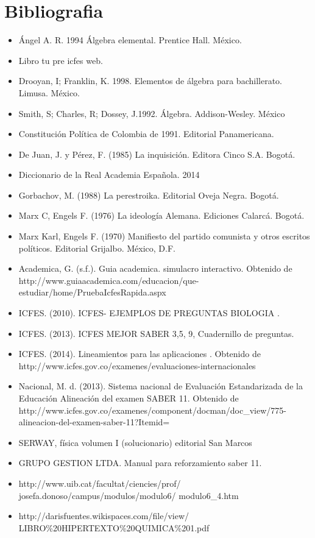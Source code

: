 \chapter{Bibliografia}

\begin{itemize}\label{vic-bib}
\item Ángel A. R. 1994 Álgebra elemental. Prentice Hall. México.
\item Libro tu pre icfes web.
\item Drooyan, I; Franklin, K. 1998. Elementos de álgebra para bachillerato. Limusa. México.
\item Smith, S; Charles, R; Dossey, J.1992. Álgebra. Addison-Wesley. México


\item Constitución Política de Colombia de 1991. Editorial Panamericana.
\item De Juan, J. y Pérez, F. (1985) La inquisición. Editora Cinco S.A. Bogotá.
\item Diccionario de la Real Academia Española. 2014
\item Gorbachov, M. (1988) La perestroika. Editorial Oveja Negra. Bogotá.
\item Marx C, Engels F. (1976) La ideología Alemana. Ediciones Calarcá. Bogotá.
\item Marx Karl, Engels F. (1970) Manifiesto del partido comunista y otros escritos políticos. Editorial Grijalbo. México, D.F.

\item Academica, G. (s.f.). Guia academica. simulacro interactivo. Obtenido de http://www.guiaacademica.com/educacion/que-estudiar/home/PruebaIcfesRapida.aspx
\item ICFES. (2010). ICFES- EJEMPLOS DE PREGUNTAS BIOLOGIA .
\item ICFES. (2013). ICFES MEJOR SABER 3,5, 9, Cuadernillo de preguntas.
\item ICFES. (2014). Lineamientos para las aplicaciones . Obtenido de http://www.icfes.gov.co/examenes/evaluaciones-internacionales
\item Nacional, M. d. (2013). Sistema nacional de Evaluación Estandarizada de la Educación Alineación del examen SABER 11. Obtenido de http://www.icfes.gov.co/examenes/component/docman/doc\_view/775-alineacion-del-examen-saber-11?Itemid=

\item SERWAY, física volumen I (solucionario) editorial San Marcos
\item GRUPO GESTION LTDA. Manual para reforzamiento saber 11.

\item http://www.uib.cat/facultat/ciencies/prof/ josefa.donoso/campus/modulos/modulo6/ modulo6\_4.htm

\item http://darisfuentes.wikispaces.com/file/view/ LIBRO\%20HIPERTEXTO\%20QUIMICA\%201.pdf
\end{itemize}

